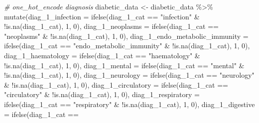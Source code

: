 \documentclass[
]{article}
\newenvironment{Shaded}{\begin{snugshade}}{\end{snugshade}}
\newcommand{\AttributeTok}[1]{\textcolor[rgb]{0.77,0.63,0.00}{#1}}
\newcommand{\CommentTok}[1]{\textcolor[rgb]{0.56,0.35,0.01}{\textit{#1}}}
\newcommand{\DecValTok}[1]{\textcolor[rgb]{0.00,0.00,0.81}{#1}}
\newcommand{\FunctionTok}[1]{\textcolor[rgb]{0.00,0.00,0.00}{#1}}
\newcommand{\NormalTok}[1]{#1}
\newcommand{\OtherTok}[1]{\textcolor[rgb]{0.56,0.35,0.01}{#1}}
\newcommand{\SpecialCharTok}[1]{\textcolor[rgb]{0.00,0.00,0.00}{#1}}
\newcommand{\StringTok}[1]{\textcolor[rgb]{0.31,0.60,0.02}{#1}}
\begin{document}
\begin{Shaded}
\begin{Highlighting}[]
\CommentTok{\# one\_hot\_encode diagnosis}
\NormalTok{diabetic\_data }\OtherTok{\textless{}{-}}\NormalTok{ diabetic\_data }\SpecialCharTok{\%\textgreater{}\%}
    \FunctionTok{mutate}\NormalTok{(}\AttributeTok{diag\_1\_infection =} \FunctionTok{ifelse}\NormalTok{(diag\_1\_cat }\SpecialCharTok{==}
        \StringTok{"infection"} \SpecialCharTok{\&} \SpecialCharTok{!}\FunctionTok{is.na}\NormalTok{(diag\_1\_cat), }\DecValTok{1}\NormalTok{, }\DecValTok{0}\NormalTok{), }\AttributeTok{diag\_1\_neoplasms =} \FunctionTok{ifelse}\NormalTok{(diag\_1\_cat }\SpecialCharTok{==}
        \StringTok{"neoplasms"} \SpecialCharTok{\&} \SpecialCharTok{!}\FunctionTok{is.na}\NormalTok{(diag\_1\_cat), }\DecValTok{1}\NormalTok{, }\DecValTok{0}\NormalTok{), }\AttributeTok{diag\_1\_endo\_metabolic\_immunity =} \FunctionTok{ifelse}\NormalTok{(diag\_1\_cat }\SpecialCharTok{==}
        \StringTok{"endo\_metabolic\_immunity"} \SpecialCharTok{\&} \SpecialCharTok{!}\FunctionTok{is.na}\NormalTok{(diag\_1\_cat),}
        \DecValTok{1}\NormalTok{, }\DecValTok{0}\NormalTok{), }\AttributeTok{diag\_1\_haematology =} \FunctionTok{ifelse}\NormalTok{(diag\_1\_cat }\SpecialCharTok{==}
        \StringTok{"haematology"} \SpecialCharTok{\&} \SpecialCharTok{!}\FunctionTok{is.na}\NormalTok{(diag\_1\_cat), }\DecValTok{1}\NormalTok{, }\DecValTok{0}\NormalTok{),}
        \AttributeTok{diag\_1\_mental =} \FunctionTok{ifelse}\NormalTok{(diag\_1\_cat }\SpecialCharTok{==} \StringTok{"mental"} \SpecialCharTok{\&}
            \SpecialCharTok{!}\FunctionTok{is.na}\NormalTok{(diag\_1\_cat), }\DecValTok{1}\NormalTok{, }\DecValTok{0}\NormalTok{), }\AttributeTok{diag\_1\_neurology =} \FunctionTok{ifelse}\NormalTok{(diag\_1\_cat }\SpecialCharTok{==}
            \StringTok{"neurology"} \SpecialCharTok{\&} \SpecialCharTok{!}\FunctionTok{is.na}\NormalTok{(diag\_1\_cat), }\DecValTok{1}\NormalTok{, }\DecValTok{0}\NormalTok{),}
        \AttributeTok{diag\_1\_circulatory =} \FunctionTok{ifelse}\NormalTok{(diag\_1\_cat }\SpecialCharTok{==} \StringTok{"circulatory"} \SpecialCharTok{\&}
            \SpecialCharTok{!}\FunctionTok{is.na}\NormalTok{(diag\_1\_cat), }\DecValTok{1}\NormalTok{, }\DecValTok{0}\NormalTok{), }\AttributeTok{diag\_1\_respiratory =} \FunctionTok{ifelse}\NormalTok{(diag\_1\_cat }\SpecialCharTok{==}
            \StringTok{"respiratory"} \SpecialCharTok{\&} \SpecialCharTok{!}\FunctionTok{is.na}\NormalTok{(diag\_1\_cat), }\DecValTok{1}\NormalTok{,}
            \DecValTok{0}\NormalTok{), }\AttributeTok{diag\_1\_digestive =} \FunctionTok{ifelse}\NormalTok{(diag\_1\_cat }\SpecialCharTok{==}

\end{Highlighting}
\end{Shaded}
\end{document}
